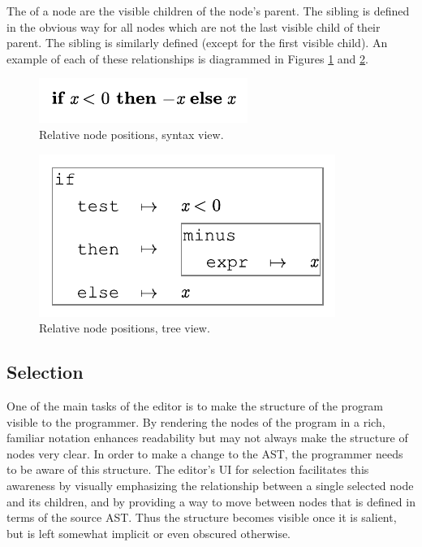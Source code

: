 The  of a node are the visible children of the node's parent. The  sibling is defined in the obvious way for all nodes which are not the last visible child of their parent. The  sibling is similarly defined (except for the first visible child). An example of each of these relationships is diagrammed in Figures \ref{fig-position} and \ref{fig-position-tree}.

\begin{figure}
  
  \includegraphics{src/image/position.pdf}
  \caption{Relative node positions, syntax view.}
  \label{fig-position}
\end{figure}

\begin{figure}
  
  \includegraphics{src/image/position-gen.pdf}
  \caption{Relative node positions, tree view.}
  \label{fig-position-tree}
\end{figure}

\subsection{Selection}
One of the main tasks of the editor is to make the structure of the program visible to the programmer. By rendering the nodes of the program in a rich, familiar notation enhances readability but may not always make the structure of nodes very clear. In order to make a change to the AST, the programmer needs to be aware of this structure. The editor's UI for selection facilitates this awareness by visually emphasizing the relationship between a single selected node and its children, and by providing a way to move between nodes that is defined in terms of the source AST. Thus the structure becomes visible once it is salient, but is left somewhat implicit or even obscured otherwise.

